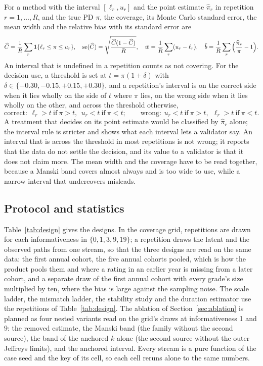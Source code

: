 For a method with the interval $[\ell_r,u_r]$ and the point estimate $\widehat\pi_r$ in repetition $r=1,\dots,R$, and the true PD $\pi$, the coverage, its Monte Carlo standard error, the mean width and the relative bias with its standard error are
\begin{equation}
\widehat C=\frac1R\sum_{r}\mathbf{1}\{\ell_r\le\pi\le u_r\},\quad \mathrm{se}(\widehat C)=\sqrt{\frac{\widehat C(1-\widehat C)}{R}},\quad \bar w=\frac1R\sum_{r}(u_r-\ell_r),\quad \bar b=\frac1R\sum_{r}\Big(\frac{\widehat\pi_r}{\pi}-1\Big).
\label{eq:metrics}
\end{equation}
An interval that is undefined in a repetition counts as not covering. For the decision use, a threshold is set at $t=\pi(1+\delta)$ with $\delta\in\{-0.30,-0.15,+0.15,+0.30\}$, and a repetition's interval is on the correct side when it lies wholly on the side of $t$ where $\pi$ lies, on the wrong side when it lies wholly on the other, and across the threshold otherwise,
\begin{equation}
\text{correct}:\ \ell_r>t\ \text{if}\ \pi>t,\ \ u_r<t\ \text{if}\ \pi<t;\qquad \text{wrong}:\ u_r<t\ \text{if}\ \pi>t,\ \ \ell_r>t\ \text{if}\ \pi<t.
\label{eq:decision}
\end{equation}
A treatment that decides on its point estimate would be classified by $\widehat\pi_r$ alone; the interval rule is stricter and shows what each interval lets a validator say. An interval that is across the threshold in most repetitions is not wrong; it reports that the data do not settle the decision, and its value to a validator is that it does not claim more. The mean width and the coverage have to be read together, because a Manski band covers almost always and is too wide to use, while a narrow interval that undercovers misleads.

\subsection{Protocol and statistics}

Table~\ref{tab:design} gives the designs. In the coverage grid,  repetitions are drawn for each informativeness in $\{0,1,3,9,19\}$; a repetition draws the latent and the observed paths from one stream, so that the three designs are read on the same data: the first annual cohort, the five annual cohorts pooled, which is how the product pools them and where a rating \wdn{} in an earlier year is missing from a later cohort, and a separate draw of the first annual cohort with every grade's size multiplied by ten, where the bias is large against the sampling noise. The scale ladder, the mismatch ladder, the stability study and the duration estimator use the repetitions of Table~\ref{tab:design}. The ablation of Section~\ref{sec:ablation} is planned as four nested variants read on the grid's draws at informativeness 1 and 9: the removed estimate, the Manski band (the family without the second source), the band of the anchored $k$ alone (the second source without the outer Jeffreys limits), and the anchored interval. Every stream is a pure function of the case seed  and the key of its cell, so each cell reruns alone to the same numbers.

